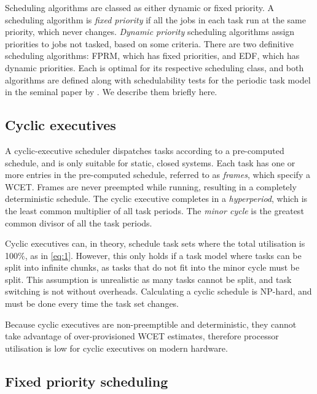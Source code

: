 Scheduling algorithms are classed as either dynamic or fixed priority. A scheduling algorithm 
is \emph{fixed priority} if all the jobs in each task run at the same priority, which never changes. 
\emph{Dynamic priority} scheduling algorithms assign priorities to jobs not tasked, based on some criteria. 
There are two definitive scheduling algorithms: \gls{FPRM}, which has fixed priorities, and
\gls{EDF}, which has dynamic priorities. Each is optimal for its respective scheduling class,  and both algorithms are defined along with
schedulability tests for the periodic task model in the seminal paper by \citet{Liu_Layland_73}. We
describe them briefly here. 

\subsection{Cyclic executives}
\label{s:cyclic-executive}

A cyclic-executive scheduler dispatches tasks according to a pre-computed schedule, and is only
suitable for static, closed systems. Each task
has one or more entries in the pre-computed schedule, referred to as \emph{frames}, which specify a
\gls{WCET}. Frames are never preempted while running, resulting in a completely deterministic
schedule. The cyclic executive completes in a
\emph{hyperperiod}, which is the least common multiplier of all task periods. The \emph{minor cycle}
is the greatest common divisor of all the task periods.

Cyclic executives can, in theory, schedule task sets where the total utilisation is 100\%, as in \cref{eq:1}.
However, this only holds
if a task model where tasks can be split into infinite chunks, as tasks that do not fit into the
minor cycle must be split. This assumption is unrealistic as many tasks
cannot be split, and task switching is not without overheads. Calculating a cyclic schedule is
NP-hard, and must be done every time the task set changes.

Because cyclic executives are non-preemptible and deterministic, they cannot take advantage of 
over-provisioned \gls{WCET} estimates, therefore processor utilisation is low
for cyclic executives on modern hardware. 

\subsection{Fixed priority scheduling}
\label{s:fp}

